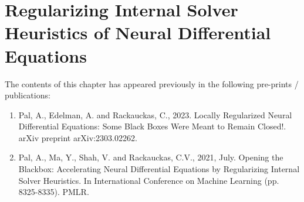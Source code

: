 \chapter{Regularizing Internal Solver Heuristics of Neural Differential Equations}
\label{chapter:internal_solver_heuristics_regularized_neural_des}

The contents of this chapter has appeared previously in the following pre-prints / publications:
%
\begin{enumerate}
  \item Pal, A., Edelman, A. and Rackauckas, C., 2023. Locally Regularized Neural Differential Equations: Some Black Boxes Were Meant to Remain Closed!. arXiv preprint arXiv:2303.02262.~\citep{pal2023locally}
  \item Pal, A., Ma, Y., Shah, V. and Rackauckas, C.V., 2021, July. Opening the Blackbox: Accelerating Neural Differential Equations by Regularizing Internal Solver Heuristics. In International Conference on Machine Learning (pp. 8325-8335). PMLR.~\citep{pal2021opening}
\end{enumerate}
%